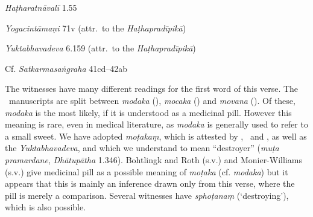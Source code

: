 \begin{ekdosis}
\begin{testimonia}[hp02_033]
\emph{Haṭharatnāvalī} 1.55

\begin{versinnote}
\end{versinnote}

\emph{Yogacintāmaṇi} 71v (attr.~to the \emph{Haṭhapradīpikā})

\begin{versinnote}
\end{versinnote}

\emph{Yuktabhavadeva} 6.159 (attr.~to the \emph{Haṭhapradīpikā})

\begin{versinnote}
\end{versinnote}

Cf. \emph{Satkarmasaṅgraha} 41cd–42ab

\begin{versinnote}
\end{versinnote}
\end{testimonia}

\begin{philcomm}[hp02_033]
The witnesses have many different readings for the first word of this verse. The \textalpha\ manuscripts are split between \emph{modaka} (\alphaOne), \emph{mocaka} (\alphaTwo) and \emph{movana} (\alphaThree). Of these, \emph{modaka} is the most likely, if it is understood as a medicinal pill. However this meaning is rare, even in medical literature, as \emph{modaka} is generally used to refer to a small sweet. We have adopted \emph{moṭakaṃ}, which is attested by \deltaTwo, \epsilonOne\ and \etaOne, as well as the \emph{Yuktabhavadeva}, and which we understand to mean “destroyer” (\emph{muṭa pramardane}, \emph{Dhātupātha} 1.346).
Bohtlingk and Roth (s.v.) and Monier-Williams (s.v.) give medicinal pill as a possible meaning of \emph{moṭaka} (cf. \emph{modaka}) but it appears that this is mainly an inference drawn only from this verse, where the pill is merely a comparison. Several witnesses have \emph{sphoṭanaṃ} (‘destroying’), which is also possible. \lb


\end{philcomm}
\end{ekdosis}
